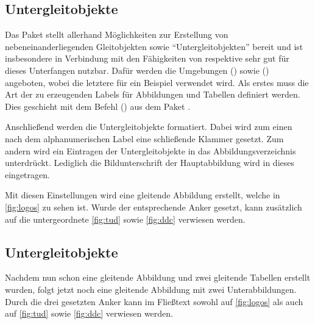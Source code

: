 \documentclass[%
  english,ngerman,%
  cdgeometry=no,DIV=12,%
  automark,%
  listof=toc,%
]{tudscrartcl}
\begin{document}
\begin{table}
\end{table}


\subsection{Untergleitobjekte}
\label{sec:subfloats}%
%
Das Paket  stellt allerhand Möglichkeiten zur Erstellung von 
nebeneinanderliegenden Gleitobjekten sowie \enquote{Untergleitobjekten} bereit 
und ist insbesondere in Verbindung mit den Fähigkeiten von  
respektive  sehr gut für dieses Unterfangen nutzbar. Dafür 
werden die Umgebungen () sowie 
() angeboten, wobei die letztere für 
ein Beispiel verwendet wird. Als erstes muss die Art der zu erzeugenden Labels 
für Abbildungen und Tabellen definiert werden. Dies geschieht mit dem Befehl 
() aus dem Paket 
.
%
\begin{Preamble}
\end{Preamble}
%
Anschließend werden die Untergleitobjekte formatiert. Dabei wird zum einen nach 
dem alphanumerischen Label eine schließende Klammer gesetzt. Zum andern wird 
ein Eintragen der Untergleitobjekte in das Abbildungsverzeichnis unterdrückt. 
Lediglich die Bildunterschrift der Hauptabbildung wird in dieses eingetragen.
%
\begin{Preamble*}
\captionsetup[subfloat]{labelformat=brace,list=off}

\end{Preamble*}
%
Mit diesen Einstellungen wird eine gleitende Abbildung erstellt, welche in 
\autoref{fig:logos} zu sehen ist. Wurde der entsprechende Anker gesetzt, kann 
zusätzlich auf die untergeordnete \autoref{fig:tud} sowie \autoref{fig:ddc} 
verwiesen werden.
%
\begin{Trunk+}
\subsection{Untergleitobjekte}
Nachdem nun schon eine gleitende Abbildung und zwei gleitende Tabellen 
erstellt wurden, folgt jetzt noch eine gleitende Abbildung mit zwei 
Unterabbildungen. Durch die drei gesetzten Anker kann im Fließtext 
sowohl auf \autoref{fig:logos} als auch auf \autoref{fig:tud} sowie 
\autoref{fig:ddc} verwiesen werden.

\end{Trunk+}
\end{document}
